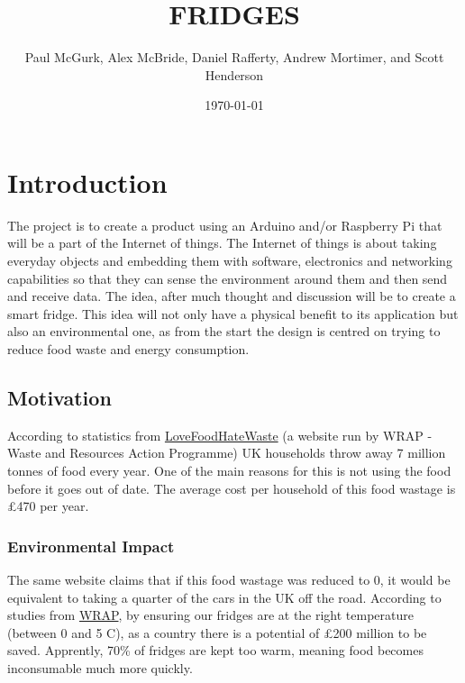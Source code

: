\documentclass[10pt]{article}
\title{FRIDGES}
\author{Paul McGurk, Alex McBride, Daniel Rafferty, Andrew Mortimer, and Scott Henderson}
\date{\today}
\begin{document}
\begin{titlepage}
\maketitle
\end{titlepage}

\linespread{1.15} %
\renewcommand{\arraystretch}{1.2} %

\tableofcontents

\newpage
\section{Introduction}

The project is to create a product using an Arduino and/or Raspberry Pi that will be a part of the Internet of things. The Internet of things is about taking everyday objects and embedding them with software, electronics and networking capabilities so that they can sense the environment around them and then send and receive data. The idea, after much thought and discussion will be to create a smart fridge. This idea will not only have a physical benefit to its application but also an environmental one, as from the start the design is centred on trying to reduce food waste and energy consumption.

\subsection{Motivation}
According to statistics from \href{http://www.lovefoodhatewaste.com/content/facts-about-food-waste-1}{LoveFoodHateWaste} (a website run by WRAP - Waste and Resources Action Programme) UK households throw away 7 million tonnes of food every year. One of the main reasons for this is not using the food before it goes out of date. The average cost per household of this food wastage is \pounds 470 per year.

\subsubsection{Environmental Impact}

The same website claims that if this food wastage was reduced to 0, it would be equivalent to taking a quarter of the cars in the UK off the road. According to studies from \href{http://www.lovefoodhatewaste.com/content/love-your-fridge-and-waste-less}{WRAP}, by ensuring our fridges are at the right temperature (between 0 and 5 \degree C), as a country there is a potential of \pounds 200 million to be saved. Apprently, 70\% of fridges are kept too warm, meaning food becomes inconsumable much more quickly.
\end{document}
